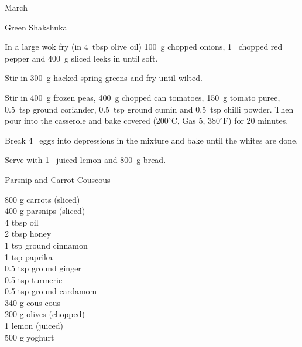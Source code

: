\begin{menu}{March}
\begin{recipe}{2}{Green Shakshuka}
    \begin{instructions}
    \item 
        In a large wok fry
        (in 4~tbsp  olive oil)
        100~g chopped onions,
        1~ chopped red pepper
        and
        400~g sliced leeks
        in until soft.
      \item 
        Stir in 300~g hacked spring greens
        and fry until wilted.
      \item 
        Stir in 400~g  frozen peas,
        400~g chopped can tomatoes,
        150~g  tomato puree,
        0.5~tsp  ground coriander,
        0.5~tsp  ground cumin
        and
        0.5~tsp  chilli powder.
        Then pour into the casserole
        and bake covered (200$^{\circ}$C, Gas 5, 380$^{\circ}$F) for 20 minutes.
      \item 
        Break 4~  eggs into depressions in the mixture
        and bake until the whites are done.
      \item 
        Serve with
        1~ juiced lemon
        and
        800~g  bread.
      
    \end{instructions}
    \end{recipe}%
  
    \begin{recipe}{2}{Parsnip and Carrot Couscous}%
		\begin{ingredients}
		800 g carrots (sliced) \\
	400 g parsnips (sliced) \\
	4 tbsp oil  \\
	2 tbsp honey  \\
	1 tsp ground cinnamon  \\
	1 tsp paprika  \\
	0.5 tsp ground ginger  \\
	0.5 tsp turmeric  \\
	0.5 tsp ground cardamom  \\
	340 g cous cous  \\
	200 g olives (chopped) \\
	1  lemon (juiced) \\
	500 g yoghurt  \\
	
		\end{ingredients}
	
	

\end{recipe}
\end{menu}
